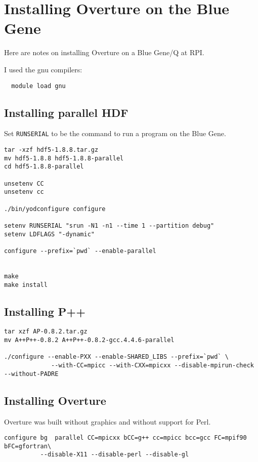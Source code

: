 \section{Installing Overture on the Blue Gene}  \label{sec:installBlueGene}

Here are  notes on installing Overture on a Blue Gene/Q at RPI.

I used the gnu compilers:
\begin{verbatim}
  module load gnu
\end{verbatim}

\subsection{Installing parallel HDF}

Set {\tt RUNSERIAL} to be the command to run a program on the Blue Gene.

\begin{verbatim}
tar -xzf hdf5-1.8.8.tar.gz
mv hdf5-1.8.8 hdf5-1.8.8-parallel
cd hdf5-1.8.8-parallel

unsetenv CC
unsetenv cc

./bin/yodconfigure configure

setenv RUNSERIAL "srun -N1 -n1 --time 1 --partition debug"
setenv LDFLAGS "-dynamic"

configure --prefix=`pwd` --enable-parallel


make
make install
\end{verbatim}


\subsection{Installing P++} 

\begin{verbatim}
tar xzf AP-0.8.2.tar.gz
mv A++P++-0.8.2 A++P++-0.8.2-gcc.4.4.6-parallel

./configure --enable-PXX --enable-SHARED_LIBS --prefix=`pwd` \
             --with-CC=mpicc --with-CXX=mpicxx --disable-mpirun-check --without-PADRE
\end{verbatim}

\subsection{Installing Overture} 

Overture was built without graphics and without support for Perl. 

\begin{verbatim}
configure bg  parallel CC=mpicxx bCC=g++ cc=mpicc bcc=gcc FC=mpif90 bFC=gfortran\
          --disable-X11 --disable-perl --disable-gl
\end{verbatim}
